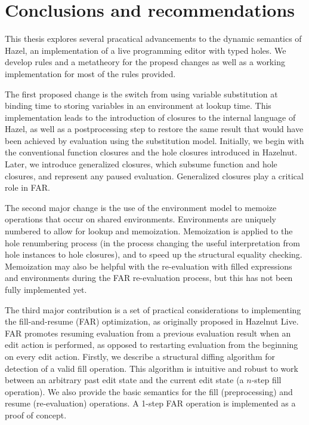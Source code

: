 \chapter{Conclusions and recommendations}
\label{sec:concl}

This thesis explores several pracatical advancements to the dynamic semantics of Hazel, an implementation of a live programming editor with typed holes. We develop rules and a metatheory for the propesd changes as well as a working implementation for most of the rules provided.

The first proposed change is the switch from using variable substitution at binding time to storing variables in an environment at lookup time. This implementation leads to the introduction of closures to the internal language of Hazel, as well as a postprocessing step to restore the same result that would have been achieved by evaluation using the substitution model. Initially, we begin with the conventional function closures and the hole closures introduced in Hazelnut. Later, we introduce generalized closures, which subsume function and hole closures, and represent any paused evaluation. Generalized closures play a critical role in FAR.

The second major change is the use of the environment model to memoize operations that occur on shared environments. Environments are uniquely numbered to allow for lookup and memoization. Memoization is applied to the hole renumbering process (in the process changing the useful interpretation from hole instances to hole closures), and to speed up the structural equality checking. Memoization may also be helpful with the re-evaluation with filled expressions and environments during the FAR re-evaluation process, but this has not been fully implemented yet.

The third major contribution is a set of practical considerations to implementing the fill-and-resume (FAR) optimization, as originally proposed in Hazelnut Live. FAR promotes resuming evaluation from a previous evaluation result when an edit action is performed, as opposed to restarting evaluation from the beginning on every edit action.  Firstly, we describe a structural diffing algorithm for detection of a valid fill operation. This algorithm is intuitive and robust to work between an arbitrary past edit state and the current edit state (a $n$-step fill operation). We also provide the basic semantics for the fill (preprocessing) and resume (re-evaluation) operations. A 1-step FAR operation is implemented as a proof of concept.

